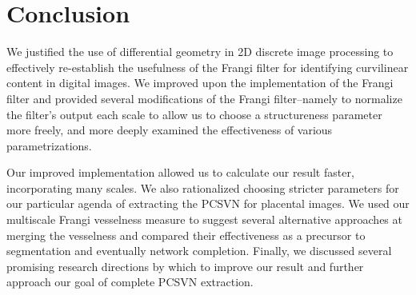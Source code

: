 \chapter{Conclusion} \label{ch:conclusion}

We justified the use of differential geometry in 2D discrete image processing to effectively re-establish the usefulness of the Frangi filter for identifying curvilinear content in digital images. We improved upon the implementation of the Frangi filter and provided several modifications of the Frangi filter--namely to normalize the filter's output each scale to allow us to choose a structureness parameter more freely, and more deeply examined the effectiveness of various parametrizations.

Our improved implementation allowed us to calculate our result faster, incorporating many scales. We also rationalized choosing stricter parameters for our particular agenda of extracting the PCSVN for placental images. We used our multiscale Frangi vesselness measure to suggest several alternative approaches at merging the vesselness and compared their effectiveness as a precursor to segmentation and eventually network completion. Finally, we discussed several promising research directions by which to improve our result and further approach our goal of complete PCSVN extraction. 

